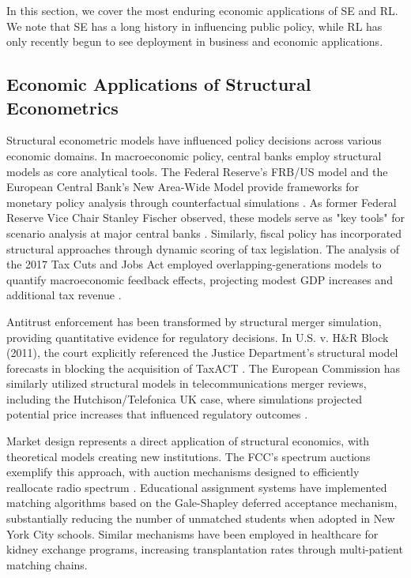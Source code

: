 In this section, we cover the most enduring economic applications of SE and RL. We note that SE has a long history in influencing public policy, while RL has only recently begun to see deployment in business and economic applications.  

\subsection{Economic Applications of Structural Econometrics}

Structural econometric models have influenced policy decisions across various economic domains. In macroeconomic policy, central banks employ structural models as core analytical tools. The Federal Reserve's FRB/US model and the European Central Bank's New Area-Wide Model provide frameworks for monetary policy analysis through counterfactual simulations \citep{Fischer2017, Constancio2018}. As former Federal Reserve Vice Chair Stanley Fischer observed, these models serve as "key tools" for scenario analysis at major central banks \citep{Fischer2017}. Similarly, fiscal policy has incorporated structural approaches through dynamic scoring of tax legislation. The analysis of the 2017 Tax Cuts and Jobs Act employed overlapping-generations models to quantify macroeconomic feedback effects, projecting modest GDP increases and additional tax revenue \citep{TCJA2018}.

Antitrust enforcement has been transformed by structural merger simulation, providing quantitative evidence for regulatory decisions. In U.S. v. H\&R Block (2011), the court explicitly referenced the Justice Department's structural model forecasts in blocking the acquisition of TaxACT \citep{ArnoldPorter2012}. The European Commission has similarly utilized structural models in telecommunications merger reviews, including the Hutchison/Telefonica UK case, where simulations projected potential price increases that influenced regulatory outcomes \citep{DLAPiper2020, BakerBotts2020}.

Market design represents a direct application of structural economics, with theoretical models creating new institutions. The FCC's spectrum auctions exemplify this approach, with auction mechanisms designed to efficiently reallocate radio spectrum \citep{FCC2020}. Educational assignment systems have implemented matching algorithms based on the Gale-Shapley deferred acceptance mechanism, substantially reducing the number of unmatched students when adopted in New York City schools. Similar mechanisms have been employed in healthcare for kidney exchange programs, increasing transplantation rates through multi-patient matching chains.


